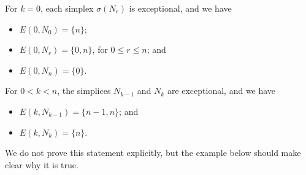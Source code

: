 \documentclass[main.tex]{subfiles}
\begin{document}
\begin{lemma}
  For $k = 0$, each simplex $\sigma(N_{r})$ is exceptional, and we have
  \begin{itemize}
    \item $E(0, N_{0}) = \{n\}$;

    \item $E(0, N_{r}) = \{0, n\}$, for $0 \leq r \leq n$; and

    \item $E(0, N_{n}) = \{0\}$.
  \end{itemize}
  For $0 < k < n$, the simplices $N_{k-1}$ and $N_{k}$ are exceptional, and we have
  \begin{itemize}
    \item $E(k, N_{k-1}) = \{n-1, n\}$; and

    \item $E(k, N_{k}) = \{n\}$.
  \end{itemize}
\end{lemma}

We do not prove this statement explicitly, but the example below should make clear why it is true.
\end{document}
